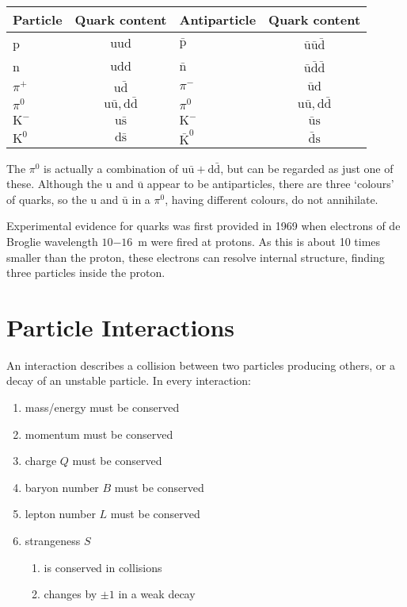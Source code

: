\documentclass[a4paper,12pt]{article}
\begin{document}
\begin{tabular}{lclc}
\hline
\hline
Particle & Quark content & Antiparticle & Quark content \\
\hline
p & $\mathrm{u}\mathrm{u}\mathrm{d}$ & $\bar{\mathrm{p}}$ & $\bar{\mathrm{u}}\bar{\mathrm{u}}\bar{\mathrm{d}}$ \\
n & $\mathrm{u}\mathrm{d}\mathrm{d}$ & $\bar{\mathrm{n}}$ & $\bar{\mathrm{u}}\bar{\mathrm{d}}\bar{\mathrm{d}}$ \\
$\pi^{+}$ & $\mathrm{u}\bar{\mathrm{d}}$ & $\pi^{-}$ & $\bar{\mathrm{u}}\mathrm{d}$ \\
$\pi^{0}$ & $\mathrm{u}\bar{\mathrm{u}},\mathrm{d}\bar{\mathrm{d}}$ & $\pi^{0}$ & $\mathrm{u}\bar{\mathrm{u}},\mathrm{d}\bar{\mathrm{d}}$ \\
$\mathrm{K}^{-}$ & $\mathrm{u}\bar{\mathrm{s}}$ & $\mathrm{K}^{-}$ & $\bar{\mathrm{u}}\mathrm{s}$ \\
$\mathrm{K}^{0}$ & $\mathrm{d}\bar{\mathrm{s}}$ & $\bar{\mathrm{K}}^{0}$ & $\bar{\mathrm{d}}\mathrm{s}$ \\
\hline
\hline
\end{tabular}

The $\pi^{0}$ is actually a combination of $\mathrm{u}\bar{\mathrm{u}}+\mathrm{d}\bar{\mathrm{d}}$, but can be regarded as just one of these.  Although the u and $\bar{\mathrm{u}}$ appear to be antiparticles, there are three `colours' of quarks, so the u and $\bar{\mathrm{u}}$ in a $\pi^{0}$, having different colours, do not annihilate.

Experimental evidence for quarks was first provided in 1969 when electrons of de Broglie wavelength $10{-16}$~m were fired at protons.  As this is about 10 times smaller than the proton, these electrons can resolve internal structure, finding three particles inside the proton.

\section{Particle Interactions}

An interaction describes a collision between two particles producing others, or a decay of an unstable particle.  In every interaction:
\begin{enumerate}
\item mass/energy must be conserved
\item momentum must be conserved
\item charge $Q$ must be conserved
\item baryon  number $B$ must be conserved
\item lepton number $L$ must be conserved
\item strangeness $S$ \begin{enumerate}\item is conserved in collisions
\item changes by $\pm 1$ in a weak decay\end{enumerate}
\end{enumerate}
\end{document}
